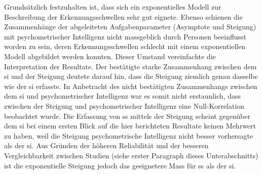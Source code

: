 \documentclass[11pt, twoside, a4paper]{book}		%
\begin{document}
Grundsätzlich festzuhalten ist, dass sich ein exponentielles Modell zur Beschreibung der Erkennungsschwellen sehr gut eignete. Ebenso schienen die Zusammenhänge der abgeleiteten Aufgabenparameter (Asymptote und Steigung) mit psychometrischer Intelligenz nicht massgeblich durch Personen beeinflusst worden zu sein, deren Erkennungsschwellen schlecht mit einem exponentiellen Modell abgebildet werden konnten. Dieser Umstand vereinfachte die Interpretation der Resultate. Der bestätigte starke Zusammenhang zwischen dem \gls{si} und der Steigung deutete darauf hin, dass die Steigung ziemlich genau dasselbe wie der \gls{si} erfasste. In Anbetracht des nicht bestätigten Zusammenhangs zwischen dem \gls{si} und psychometrischer Intelligenz war es somit nicht erstaunlich, dass zwischen der Steigung und psychometrischer Intelligenz eine Null-Korrelation beobachtet wurde. Die Erfassung von \gls{ss} mittels der Steigung scheint gegenüber dem \gls{si} bei einem ersten Blick auf die hier berichteten Resultate keinen Mehrwert zu haben, weil die Steigung psychometrische Intelligenz nicht besser vorhersagte als der \gls{si}. Aus Gründen der höheren Reliabilität und der besseren Vergleichbarkeit zwischen Studien (siehe erster Paragraph dieses Unterabschnitts) ist die exponentielle Steigung jedoch das geeignetere Mass für \gls{ss} als der \gls{si}.
\end{document}
